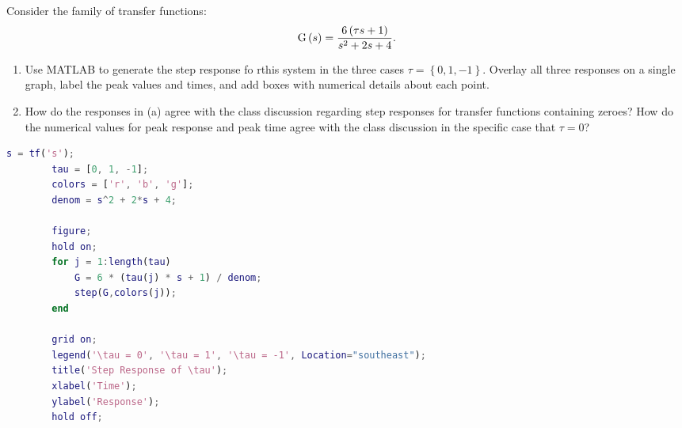 

%
%

\newcommand{\hmwkTitle}{Homework 05}
\newcommand{\hmwkSubTitle}{MATLAB \& Transfer Functions}
\newcommand{\hmwkDueDate}{March 7th, 2025}
\newcommand{\hmwkDueTime}{05:00 PM}
\newcommand{\hmwkClass}{ENAE 432  0101}
\newcommand{\hmwkClassTime}{09:00}
\newcommand{\hmwkClassInstructor}{Dr.\ Sanner}
\newcommand{\hmwkAuthorName}{\textbf{Vai Srivastava}}
\newcommand{\hmwkCompletionDate}{\today}



\maketitle

\pagebreak

\begin{hwkProblem}{1}{}

	Consider the family of transfer functions: \[ \func{G}[s] = \frac{6 \left(\tau s + 1\right)}{s^{2} + 2s + 4}. \]
	\begin{enumerate}
		\item Use MATLAB to generate the step response fo rthis system in the three cases \( \tau = \left\{0, 1, -1\right\} \). Overlay all three responses on a single graph, label the peak values and times, and add boxes with numerical details about each point.
		\item How do the responses in (a) agree with the class discussion regarding step responses for transfer functions containing zeroes? How do the numerical values for peak response and peak time agree with the class discussion in the specific case that \( \tau = 0 \)?
	\end{enumerate}

	\hwkSol{}

	\begin{lstlisting}[language={matlab}, label={lst:s01a}, caption={MATLAB code for HW05 P01a}]
		s = tf('s');
		tau = [0, 1, -1];
		colors = ['r', 'b', 'g'];
		denom = s^2 + 2*s + 4;

		figure; 
		hold on;
		for j = 1:length(tau)
			G = 6 * (tau(j) * s + 1) / denom;
			step(G,colors(j));
		end

		grid on;
		legend('\tau = 0', '\tau = 1', '\tau = -1', Location="southeast");
		title('Step Response of \tau');
		xlabel('Time');
		ylabel('Response');
		hold off;
	\end{lstlisting}

\end{hwkProblem}


